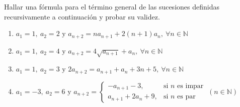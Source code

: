 \begin{enunciado}{\ejercicio}
    Hallar una fórmula para el término general de las sucesiones definidas recursivamente a continuación
    y probar su validez.
    \begin{enumerate}[label=\roman*)]
        \item $a_1 = 1,\ a_2 = 2 \text{ y } a_{n+2} = n a_{n+1} + 2(n+1)a_n,\ \forall n \in \mathbb{N}$
        \item $a_1 = 1,\ a_2 = 4 \text{ y } a_{n+2} = 4 \sqrt{a_{n+1}} + a_n,\ \forall n \in \mathbb{N}$
        \item $a_1 = 1,\ a_2 = 3 \text{ y } 2 a_{n+2} = a_{n+1} + a_n + 3n + 5,\ \forall n \in \mathbb{N}$ 
        \item $a_1 = -3,\ a_2 = 6 \text{ y } 
        a_{n+2} = 
        \begin{cases}
            -a_{n+1} - 3, &\text{si $n$ es impar} \\
            a_{n+1} + 2 a_n + 9, &\text{si $n$ es par}
        \end{cases}
        \  (n \in \mathbb{N})$
    \end{enumerate}
\end{enunciado}
